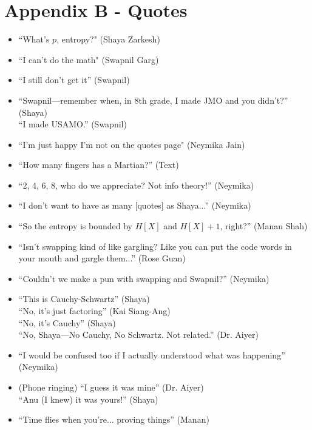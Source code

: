 \documentclass[11pt]{article}
\theoremstyle{definition}
\begin{document}
\section*{Appendix B - Quotes}
\begin{itemize}
\item ``What's $p$, entropy?" (Shaya Zarkesh)
\item ``I can't do the math" (Swapnil Garg)
\item ``I still don't get it'' (Swapnil)
\item ``Swapnil---remember when, in 8th grade, I made JMO and you didn't?'' (Shaya) \\``I made USAMO.'' (Swapnil)
\item ``I'm just happy I'm not on the quotes page" (Neymika Jain)
\item ``How many fingers has a Martian?'' (Text)
\item ``2, 4, 6, 8, who do we appreciate? Not info theory!'' (Neymika)
\item ``I don't want to have as many [quotes] as Shaya...'' (Neymika)
\item ``So the entropy is bounded by $H[X]$ and $H[X] + 1$, right?'' (Manan Shah)
\item ``Isn't swapping kind of like gargling? Like you can put the code words in your mouth and gargle them...'' (Rose Guan)
\item ``Couldn't we make a pun with swapping and Swapnil?'' (Neymika)
\item ``This is Cauchy-Schwartz'' (Shaya) \\``No, it's just factoring'' (Kai Siang-Ang)\\``No, it's Cauchy'' (Shaya)\\``No, Shaya---No Cauchy, No Schwartz. Not related.'' (Dr. Aiyer)
\item ``I would be confused too if I actually understood what was happening'' (Neymika)
\item (Phone ringing) ``I guess it was mine'' (Dr. Aiyer) \\ ``Anu (I knew) it was yours!'' (Shaya)
\item ``Time flies when you're... proving things'' (Manan)
\end{itemize}
\end{document}
